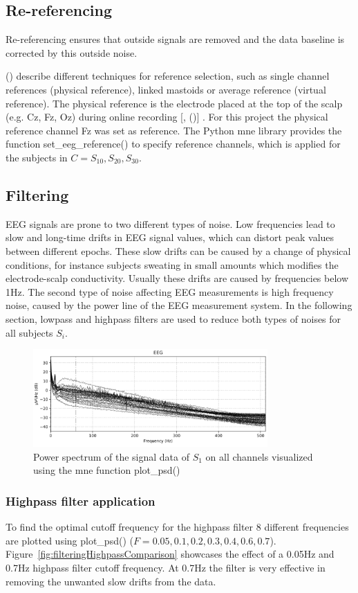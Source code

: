 \documentclass[a4paper]{article}
\newcommand{\caay}[2][]{
\citeauthor{#2} (\citeyear[#1]{#2})\xspace
}
\newcommand{\pcaay}[2][]{
[\citeauthor{#2}, (\citeyear[#1]{#2})]\xspace
}
\begin{document}
\subsection{Re-referencing}
Re-referencing ensures that outside signals are removed and the data baseline is corrected by this outside noise.
\caay{Yao2019} describe different techniques for reference selection, such as single channel references (physical reference), linked mastoids or average reference (virtual reference).
The physical reference is the electrode placed at the top of the scalp (e.g. Cz, Fz, Oz) during online recording\pcaay{Hu2019}.
For this project the physical reference channel Fz was set as reference.
The Python mne library provides the function set\_eeg\_reference() to specify reference channels, which is applied for the subjects in $C = {S_{10}, S_{20}, S_{30}}$.

\subsection{Filtering}
EEG signals are prone to two different types of noise.
Low frequencies lead to slow and long-time drifts in EEG signal values, which can distort peak values between different epochs.
These slow drifts can be caused by a change of physical conditions, for instance subjects sweating in small amounts which modifies the electrode-scalp conductivity.
Usually these drifts are caused by frequencies below 1Hz.
The second type of noise affecting EEG measurements is high frequency noise, caused by the power line of the EEG measurement system.
In the following section, lowpass and highpass filters are used to reduce both types of noises for all subjects $S_i$.

\begin{figure}[tbh!] 
  \centering
     \includegraphics[width=0.8\textwidth]{eeg_psd.png}
  \caption{Power spectrum of the signal data of $S_1$ on all channels visualized using the mne function plot\_psd()}
  \label{fig:eeg_psd}
\end{figure}

\subsubsection{Highpass filter application}
To find the optimal cutoff frequency for the highpass filter 8 different frequencies are plotted using plot\_psd() 
($F={0.05, 0.1, 0.2, 0.3, 0.4, 0.6, 0.7}$).
Figure~\ref{fig:filteringHighpassComparison} showcases the effect of a 0.05Hz and 0.7Hz highpass filter cutoff frequency.
At 0.7Hz the filter is very effective in removing the unwanted slow drifts from the data. 
\end{document}
